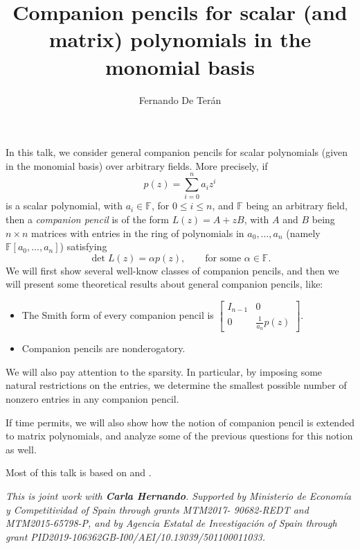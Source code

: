 \documentclass[a4paper]{amsart}
\date{}
\begin{document}
\title{Companion pencils for scalar (and matrix) polynomials in the monomial basis}
\author{Fernando De Ter\'an} %
\address{Universidad Carlos III de Madrid} %

\maketitle


In this talk, we consider general companion pencils for scalar polynomials (given in the monomial basis) over arbitrary fields. More precisely, if 
$$
p(z)=\sum_{i=0}^n a_iz^{i}
$$ 
is a scalar polynomial, with $a_i\in\mathbb F$, for $0\leq i\leq n$, and $\mathbb F$ being an arbitrary field, then a {\em companion pencil} is of the form $L(z)=A+z B$, with $A$ and $B$ being $n\times n$ matrices with entries in the ring  of polynomials in $a_0,\hdots,a_n$ (namely $\mathbb F[a_0,\hdots,a_n]$) satisfying
$$
\det L(z)=\alpha p(z),\qquad\mbox{for some $\alpha\in\mathbb F$}.
$$
We will first show several well-know classes of companion pencils, and then we will present some theoretical results about general companion pencils, like:
\begin{itemize}
\item The Smith form of every companion pencil is $\left[\begin{smallmatrix}I_{n-1}&0\\0&\frac{1}{a_n}p(z)\end{smallmatrix}\right]$.
\item Companion pencils are nonderogatory.
\end{itemize}

We will also pay attention to the sparsity. In particular, by imposing some natural restrictions on the entries, we determine
the smallest possible number of nonzero entries in any companion pencil.


If time permits, we will also show how the notion of companion pencil is extended to matrix polynomials, and analyze some of the previous questions for this notion as well.

Most of this talk is based on \cite{dh-cortona} and \cite{dh-racsam}.


\bigskip

\emph{This is joint work with {\bf Carla Hernando}.
Supported by Ministerio de Econom\'ia y Competitividad of Spain through grants MTM2017-
90682-REDT and MTM2015-65798-P, and by Agencia Estatal de Investigaci\'on of Spain through grant PID2019-106362GB-I00/AEI/10.13039/501100011033.}
\end{document}
